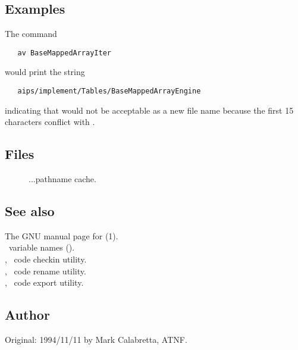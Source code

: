 \subsection*{Examples}

The command

\begin{verbatim}
   av BaseMappedArrayIter
\end{verbatim}

\noindent
would print the string

\begin{verbatim}
   aips/implement/Tables/BaseMappedArrayEngine
\end{verbatim}

\noindent
indicating that  would not be acceptable as a new
file name because the first 15 characters conflict with
.

\subsection*{Files}

\begin{description}
\item[]
...pathname cache.
\end{description}

\subsection*{See also}

The GNU manual page for (1).\\
\aipspp\ variable names ().\\
, \aipspp\ code checkin utility.\\
, \aipspp\ code rename utility.\\
, \aipspp\ code export utility.\\

\subsection*{Author}

Original: 1994/11/11 by Mark Calabretta, ATNF.


\newpage
\section{}
\label{avers}

